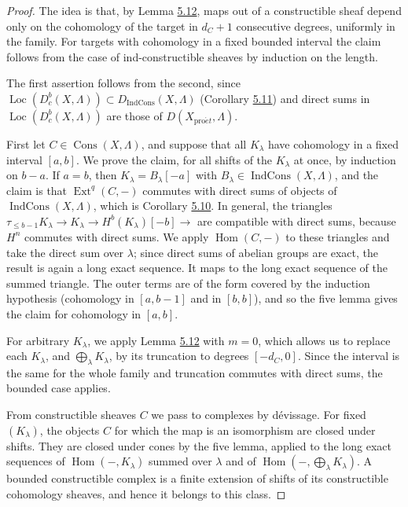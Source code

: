 \documentclass[11pt]{article}
\providecommand{\Cons}{}\renewcommand{\Cons}{\operatorname{Cons}}
\providecommand{\Dbc}{}\renewcommand{\Dbc}{D^b_c}
\providecommand{\Dic}{}\renewcommand{\Dic}{D_{\IndCons}}
\providecommand{\Ext}{}\renewcommand{\Ext}{\operatorname{Ext}}
\providecommand{\Hom}{}\renewcommand{\Hom}{\operatorname{Hom}}
\providecommand{\IndCons}{}\renewcommand{\IndCons}{\operatorname{IndCons}}
\providecommand{\Loc}{}\renewcommand{\Loc}{\operatorname{Loc}}
\begin{document}
\begin{proof}[{Proof}]\label{bp447}%
The idea is that, by Lemma \hyperref[bp443]{5.12}, maps out of a constructible sheaf depend only on the cohomology of the target in \(d_C+1\) consecutive degrees, uniformly in the family. For targets with cohomology in a fixed bounded interval the claim follows from the case of ind-constructible sheaves by induction on the length.

The first assertion follows from the second, since \(\Loc(\Dbc(X,\Lambda))\subset\Dic(X,\Lambda)\) (Corollary \hyperref[bp439]{5.11}) and direct sums in \(\Loc(\Dbc(X,\Lambda))\) are those of \(D(X_{\mathrm{pro}\acute{e}t},\Lambda)\).

First let \(C\in\Cons(X,\Lambda)\), and suppose that all \(K_\lambda\) have cohomology in a fixed interval \([a,b]\). We prove the claim, for all shifts of the \(K_\lambda\) at once, by induction on \(b-a\). If \(a=b\), then \(K_\lambda=B_\lambda[-a]\) with \(B_\lambda\in\IndCons(X,\Lambda)\), and the claim is that \(\Ext^q(C,-)\) commutes with direct sums of objects of \(\IndCons(X,\Lambda)\), which is Corollary \hyperref[bp436]{5.10}. In general, the triangles \(\tau_{\leq b-1}K_\lambda\to K_\lambda\to H^b(K_\lambda)[-b]\to\) are compatible with direct sums, because \(H^n\) commutes with direct sums. We apply \(\Hom(C,-)\) to these triangles and take the direct sum over \(\lambda\); since direct sums of abelian groups are exact, the result is again a long exact sequence. It maps to the long exact sequence of the summed triangle. The outer terms are of the form covered by the induction hypothesis (cohomology in \([a,b-1]\) and in \([b,b]\)), and so the five lemma gives the claim for cohomology in \([a,b]\).

For arbitrary \(K_\lambda\), we apply Lemma \hyperref[bp443]{5.12} with \(m=0\), which allows us to replace each \(K_\lambda\), and \(\bigoplus_\lambda K_\lambda\), by its truncation to degrees \([-d_C,0]\). Since the interval is the same for the whole family and truncation commutes with direct sums, the bounded case applies.

From constructible sheaves \(C\) we pass to complexes by dévissage. For fixed \((K_\lambda)\), the objects \(C\) for which the map is an isomorphism are closed under shifts. They are closed under cones by the five lemma, applied to the long exact sequences of \(\Hom(-,K_\lambda)\) summed over \(\lambda\) and of \(\Hom(-,\bigoplus_\lambda K_\lambda)\). A bounded constructible complex is a finite extension of shifts of its constructible cohomology sheaves, and hence it belongs to this class.
\end{proof}
\end{document}
